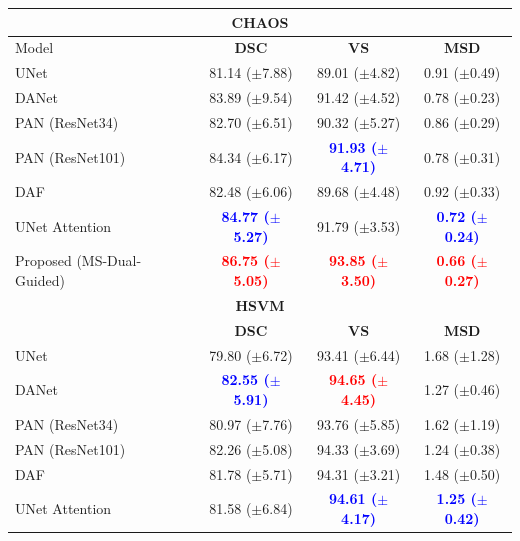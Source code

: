 \documentclass[journal]{IEEEtran}
\begin{document}
\begin{table}[t!]
\centering
\scriptsize
\begin{tabular}{lccc}\\
\toprule
\multicolumn{4}{c}{\textbf{CHAOS}}\\
\midrule
Model & \textbf{DSC} & \textbf{VS} & \textbf{MSD} \\
 \midrule
UNet \cite{ronneberger2015u}  &  81.14 ($\pm$7.88) & 89.01 ($\pm$4.82) & 0.91 ($\pm$0.49)  \\
DANet \cite{fu2018dual}  &   83.89 ($\pm$9.54) & 91.42  ($\pm$4.52) &  0.78  ($\pm$0.23) \\
PAN (ResNet34) \cite{li2018pyramid}    & 82.70 ($\pm$6.51) & 90.32 ($\pm$5.27) & 0.86 ($\pm$0.29) \\
PAN (ResNet101)\cite{li2018pyramid}   & 84.34 ($\pm$6.17) & \textcolor{blue}{\textbf{91.93 ($\pm$4.71)}} & 0.78 ($\pm$0.31)  \\
DAF \cite{wang18d}  &   82.48 ($\pm$6.06)  & 89.68 ($\pm$4.48) &  0.92 ($\pm$0.33) \\
UNet Attention \cite{schlemper2019attention}  &  \textcolor{blue}{\textbf{84.77 ($\pm$5.27)}} & 91.79 ($\pm$3.53) & \textcolor{blue}{\textbf{0.72 ($\pm$0.24)}} \\
Proposed (MS-Dual-Guided)  &  \textcolor{red}{\textbf{86.75 ($\pm$5.05)}} & \textcolor{red}{\textbf{93.85 ($\pm$3.50)}} & \textcolor{red}{\textbf{0.66 ($\pm$0.27)}}  \\
\midrule
\multicolumn{4}{c}{\textbf{HSVM}}\\
\midrule
 & \textbf{DSC} & \textbf{VS} & \textbf{MSD}\\
 \midrule
UNet \cite{ronneberger2015u}  &  79.80 ($\pm$6.72) & 93.41 ($\pm$6.44) & 1.68 ($\pm$1.28)\\
DANet \cite{fu2018dual}  &   \textcolor{blue}{\textbf{82.55 ($\pm$5.91)}} & \textcolor{red}{\textbf{94.65 ($\pm$4.45)}} & 1.27 ($\pm$0.46) \\
PAN (ResNet34) \cite{li2018pyramid}    &  80.97 ($\pm$7.76) & 93.76 ($\pm$5.85) & 1.62 ($\pm$1.19) \\
PAN (ResNet101)\cite{li2018pyramid}   &  82.26 ($\pm$5.08) & 94.33 ($\pm$3.69) & 1.24 ($\pm$0.38) \\
DAF \cite{wang18d}  &    81.78 ($\pm$5.71)& 94.31 ($\pm$3.21) & 1.48 ($\pm$0.50) \\
UNet Attention \cite{schlemper2019attention}  & 81.58 ($\pm$6.84) & \textcolor{blue}{\textbf{94.61 ($\pm$4.17)}} & \textcolor{blue}{\textbf{1.25 ($\pm$0.42)}} \\

\end{tabular}
\end{table}
\end{document}
